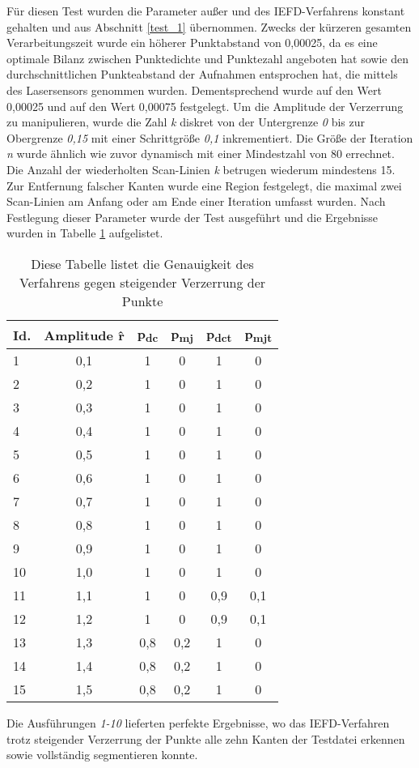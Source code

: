 Für diesen Test wurden die Parameter außer \distthresha und \distthreshb des IEFD-Verfahrens konstant gehalten und aus Abschnitt \ref{test_1} übernommen. Zwecks der kürzeren gesamten Verarbeitungszeit wurde ein höherer Punktabstand von 0,00025, da es eine optimale Bilanz zwischen Punktedichte und Punktezahl angeboten hat sowie den durchschnittlichen Punkteabstand der Aufnahmen entsprochen hat, die mittels des Lasersensors genommen wurden. Dementsprechend wurde \distthresha auf den Wert 0,00025 und \distthreshb auf den Wert 0,00075 festgelegt. Um die Amplitude der Verzerrung zu manipulieren, wurde die Zahl \textit{k} diskret von der Untergrenze \textit{0} bis zur Obergrenze \textit{0,15} mit einer Schrittgröße \textit{0,1} inkrementiert. Die Größe der Iteration \textit{n} wurde ähnlich wie zuvor dynamisch mit einer Mindestzahl von 80 errechnet. Die Anzahl der wiederholten Scan-Linien \textit{k} betrugen wiederum mindestens 15. Zur Entfernung falscher Kanten wurde eine Region festgelegt, die maximal zwei Scan-Linien am Anfang oder am Ende einer Iteration umfasst wurden. Nach Festlegung dieser Parameter wurde der Test ausgeführt und die Ergebnisse wurden in Tabelle \ref{table: point_distortion_results} aufgelistet.

\begin{table}[t]
	\centering
	\begin{tabular}[width=\textwidth]{l *{5}{c}}
		\hline
		\textbf{Id.} & \textbf{Amplitude \^{r}} & \textbf{p\textsubscript{dc}} & \textbf{p\textsubscript{mj}} & \textbf{p\textsubscript{dct}} & \textbf{p\textsubscript{mjt}} \\
		\hline
		1 & 0,1 & 1 & 0 & 1 & 0 \\
		2 & 0,2 & 1 & 0 & 1 & 0 \\
		3 & 0,3 & 1 & 0 & 1 & 0 \\
		4 & 0,4 & 1 & 0 & 1 & 0 \\
		5 & 0,5 & 1 & 0 & 1 & 0 \\
		6 & 0,6 & 1 & 0 & 1 & 0 \\
		7 & 0,7 & 1 & 0 & 1 & 0 \\
		8 & 0,8 & 1 & 0 & 1 & 0 \\
		9 & 0,9 & 1 & 0 & 1 & 0 \\
		10 & 1,0 & 1 & 0 & 1 & 0 \\
		11 & 1,1 & 1 & 0 & 0,9 & 0,1 \\
		12 & 1,2 & 1 & 0 & 0,9 & 0,1 \\
		13 & 1,3 & 0,8 & 0,2 & 1 & 0 \\
		14 & 1,4 & 0,8 & 0,2 & 1 & 0 \\
		15 & 1,5 & 0,8 & 0,2 & 1 & 0 \\
		\hline
	\end{tabular}
	\caption{Diese Tabelle listet die Genauigkeit des Verfahrens gegen steigender Verzerrung der Punkte}
	\label{table: point_distortion_results}
\end{table}

Die Ausführungen \textit{1-10} lieferten perfekte Ergebnisse, wo das IEFD-Verfahren trotz steigender Verzerrung der Punkte alle zehn Kanten der Testdatei erkennen sowie vollständig segmentieren konnte. 